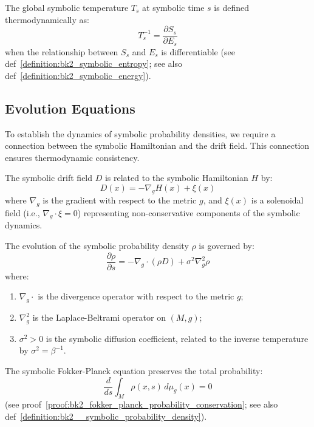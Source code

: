 \begin{definition} 
\label{definition:bk2_symbolic_temperature} 
The global symbolic temperature $T_s$ at symbolic time $s$ is defined thermodynamically as:
\[
T_s^{-1} = \frac{\partial S_s}{\partial E_s}
\]
when the relationship between $S_s$ and $E_s$ is differentiable (see def~\ref{definition:bk2_symbolic_entropy}; see also def~\ref{definition:bk2_symbolic_energy}).
\end{definition}

\subsection{Evolution Equations}
\label{subsec:bk2_evolution_equations}

To establish the dynamics of symbolic probability densities, we require a connection between the symbolic Hamiltonian and the drift field. This connection ensures thermodynamic consistency.

\begin{axiom}
\label{axiom:bk2_gradient_structure_drift}
The symbolic drift field $D$ is related to the symbolic Hamiltonian $H$ by:
\[
D(x) = -\nabla_g H(x) + \xi(x)
\]
where $\nabla_g$ is the gradient with respect to the metric $g$, and $\xi(x)$ is a solenoidal field (i.e., $\nabla_g \cdot \xi = 0$) representing non-conservative components of the symbolic dynamics.
\end{axiom}

\begin{axiom}
\label{axiom:bk2_symbolic_fokker_planck_equation}
The evolution of the symbolic probability density $\rho$ is governed by:
\[
\frac{\partial \rho}{\partial s} = -\nabla_g \cdot (\rho D) + \sigma^2 \nabla_g^2 \rho
\]
where:
\begin{enumerate}
    \item $\nabla_g \cdot$ is the divergence operator with respect to the metric $g$;
    \item $\nabla_g^2$ is the Laplace-Beltrami operator on $(M,g)$;
    \item $\sigma^2 > 0$ is the symbolic diffusion coefficient, related to the inverse temperature by $\sigma^2 = \beta^{-1}$.
\end{enumerate}
\end{axiom}

\begin{lemma} 
\label{lemma:bk2_conservation_of_probability} 
The symbolic Fokker-Planck equation preserves the total probability: 
\[
\frac{d}{ds}\int_M \rho(x,s) \, d\mu_g(x) = 0
\]
(see proof~\ref{proof:bk2_fokker_planck_probability_conservation}; see also def~\ref{definition:bk2__symbolic_probability_density}).
\end{lemma}

